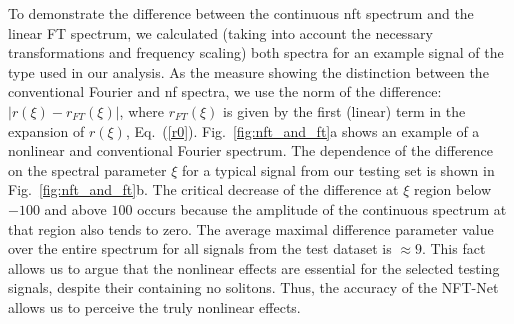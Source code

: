 To demonstrate the difference between the continuous \acrshort{nft} spectrum and the linear FT spectrum, we calculated (taking into account the necessary transformations and frequency scaling) both spectra for an example signal of the type used in our analysis.
As the measure showing the distinction between the conventional Fourier and \acrshort{nf} spectra, we use the norm of the difference: $|r(\xi) - r_{FT}(\xi)|$, where $r_{FT}(\xi)$ is given by the first (linear) term in the expansion of $r(\xi)$, Eq.~(\ref{r0}).
Fig.~\ref{fig:nft_and_ft}a shows an example of a nonlinear and conventional Fourier spectrum.
The dependence of the difference on the spectral parameter $\xi$ for a typical signal from our testing set is shown in Fig.~\ref{fig:nft_and_ft}b.
The critical decrease of the difference at $\xi$ region below $-100$ and above $100$ occurs because the amplitude of the continuous spectrum at that region also tends to zero. The average maximal difference parameter value over the entire spectrum for all signals from the test dataset is $\approx 9$. 
This fact allows us to argue that the nonlinear effects are essential for the selected testing signals, despite their containing no solitons.
Thus, the accuracy of the NFT-Net allows us to perceive the truly nonlinear effects. 

